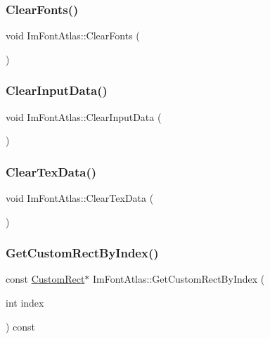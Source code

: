 \subsubsection{\texorpdfstring{Clear\+Fonts()}{ClearFonts()}}
{\footnotesize\ttfamily void Im\+Font\+Atlas\+::\+Clear\+Fonts (\begin{DoxyParamCaption}{ }\end{DoxyParamCaption})}

\hypertarget{struct_im_font_atlas_a3f5bcbb7a2683b1af106fcf4e1217662}{}\label{struct_im_font_atlas_a3f5bcbb7a2683b1af106fcf4e1217662} 
\subsubsection{\texorpdfstring{Clear\+Input\+Data()}{ClearInputData()}}
{\footnotesize\ttfamily void Im\+Font\+Atlas\+::\+Clear\+Input\+Data (\begin{DoxyParamCaption}{ }\end{DoxyParamCaption})}

\hypertarget{struct_im_font_atlas_a3ede4bd513bec044c77ac392ad9c6e86}{}\label{struct_im_font_atlas_a3ede4bd513bec044c77ac392ad9c6e86} 
\subsubsection{\texorpdfstring{Clear\+Tex\+Data()}{ClearTexData()}}
{\footnotesize\ttfamily void Im\+Font\+Atlas\+::\+Clear\+Tex\+Data (\begin{DoxyParamCaption}{ }\end{DoxyParamCaption})}

\hypertarget{struct_im_font_atlas_a4d4403e920f1d93307936781050b52ee}{}\label{struct_im_font_atlas_a4d4403e920f1d93307936781050b52ee} 
\subsubsection{\texorpdfstring{Get\+Custom\+Rect\+By\+Index()}{GetCustomRectByIndex()}}
{\footnotesize\ttfamily const \hyperlink{struct_im_font_atlas_1_1_custom_rect}{Custom\+Rect}$\ast$ Im\+Font\+Atlas\+::\+Get\+Custom\+Rect\+By\+Index (\begin{DoxyParamCaption}\item[{int}]{index }\end{DoxyParamCaption}) const}

